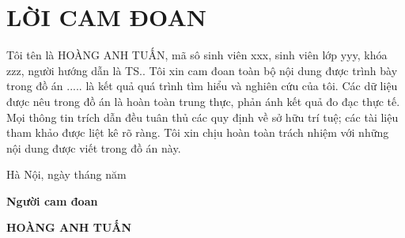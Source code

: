 \section*{LỜI CAM ĐOAN} %
\thispagestyle{empty}
Tôi tên là HOÀNG ANH TUẤN, mã sô sinh viên xxx, sinh viên lớp yyy, khóa zzz, người hướng dẫn là TS.. Tôi xin cam đoan toàn bộ nội dung được trình bày trong đồ án ..... là kết quả quá trình tìm hiểu và nghiên cứu 
của tôi. Các dữ liệu được nêu trong đồ án là hoàn toàn trung thực, phản ánh kết quả đo đạc thực tế. Mọi thông tin trích 
dẫn đều tuân thủ các quy định về sở hữu trí tuệ; các tài liệu tham khảo được liệt kê rõ ràng. Tôi xin chịu hoàn toàn trách 
nhiệm với những nội dung được viết trong đồ án này.

\vspace{6pt}

\hspace{7cm}Hà Nội, ngày  tháng   năm

\hspace{9cm}\textbf{Người cam đoan}

\vspace{2cm}
\hspace{8.65cm}\textbf{HOÀNG ANH TUẤN}

\cleardoublepage